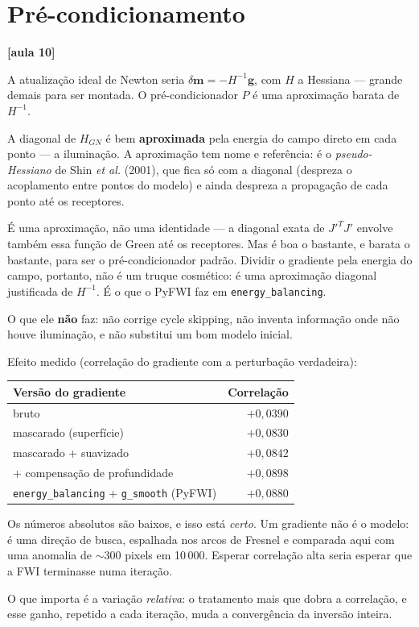 \documentclass[11pt,a4paper,oneside]{report}
\newcommand{\aula}[1]{\textcolor{cianofwi}{\textbf{[aula #1]}}}
\begin{document}
\section{Pré-condicionamento}

\aula{10}

\begin{teoria}
A atualização ideal de Newton seria $\delta\mathbf{m} = -H^{-1}\mathbf{g}$, com
$H$ a Hessiana --- grande demais para ser montada. O pré-condicionador $P$ é
uma aproximação barata de $H^{-1}$.

A diagonal de $H_{GN}$ é bem \textbf{aproximada} pela energia do campo direto
em cada ponto --- a iluminação. A aproximação tem nome e referência: é o
\emph{pseudo-Hessiano} de Shin \emph{et al.} (2001), que fica só com a
diagonal (despreza o acoplamento entre pontos do modelo) e ainda despreza a
propagação de cada ponto até os receptores.

É uma aproximação, não uma identidade --- a diagonal exata de $J'^{T}J'$
envolve também essa função de Green até os receptores. Mas é boa o bastante, e
barata o bastante, para ser o pré-condicionador padrão. Dividir o gradiente
pela energia do campo, portanto, não é um truque cosmético: é uma aproximação
diagonal justificada de $H^{-1}$. É o que o PyFWI faz em
\texttt{energy\_balancing}.

O que ele \textbf{não} faz: não corrige cycle skipping, não inventa informação
onde não houve iluminação, e não substitui um bom modelo inicial.
\end{teoria}

Efeito medido (correlação do gradiente com a perturbação verdadeira):

\begin{center}
\begin{tabular}{@{}lr@{}}
\toprule
\textbf{Versão do gradiente} & \textbf{Correlação} \\
\midrule
bruto & $+0{,}0390$ \\
mascarado (superfície) & $+0{,}0830$ \\
mascarado + suavizado & $+0{,}0842$ \\
+ compensação de profundidade & $+0{,}0898$ \\
\texttt{energy\_balancing} + \texttt{g\_smooth} (PyFWI) & $+0{,}0880$ \\
\bottomrule
\end{tabular}
\end{center}

\begin{atencao}
Os números absolutos são baixos, e isso está \emph{certo}. Um gradiente não é
o modelo: é uma direção de busca, espalhada nos arcos de Fresnel e comparada
aqui com uma anomalia de $\sim$300 pixels em 10\,000. Esperar correlação alta
seria esperar que a FWI terminasse numa iteração.

O que importa é a variação \emph{relativa}: o tratamento mais que dobra a
correlação, e esse ganho, repetido a cada iteração, muda a convergência da
inversão inteira.
\end{atencao}
\end{document}
